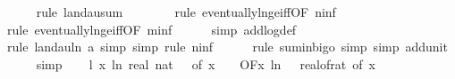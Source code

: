 \begin{isabellebody}
\ \ \ \ \isamarkupfalse%
\ {\isacharparenleft}{\kern0pt}rule\ landau{\isacharunderscore}{\kern0pt}sum{\isacharunderscore}{\kern0pt}{}{\isacharparenright}{\kern0pt}\isanewline
\ \ \ \ \ \ \isamarkupfalse%
\ {\isacharparenleft}{\kern0pt}rule\ eventually{\isacharunderscore}{\kern0pt}ln{\isacharunderscore}{\kern0pt}ge{\isacharunderscore}{\kern0pt}iff{\isacharbrackleft}{\kern0pt}OF\ n{\isacharunderscore}{\kern0pt}inf{\isacharbrackright}{\kern0pt}{\isacharparenright}{\kern0pt}\isanewline
\ \ \ \ \ \isamarkupfalse%
\ {\isacharparenleft}{\kern0pt}rule\ eventually{\isacharunderscore}{\kern0pt}ln{\isacharunderscore}{\kern0pt}ge{\isacharunderscore}{\kern0pt}iff{\isacharbrackleft}{\kern0pt}OF\ m{\isacharunderscore}{\kern0pt}inf{\isacharbrackright}{\kern0pt}{\isacharparenright}{\kern0pt}\isanewline
\ \ \ \ \isamarkupfalse%
\ {\isacharparenleft}{\kern0pt}simp\ add{\isacharcolon}{\kern0pt}log{\isacharunderscore}{\kern0pt}def{\isacharparenright}{\kern0pt}\isanewline
\ \ \ \ \isamarkupfalse%
\ {\isacharparenleft}{\kern0pt}rule\ landau{\isacharunderscore}{\kern0pt}ln{\isacharunderscore}{\kern0pt}{}{\isacharbrackleft}{\kern0pt}\ a{\isacharequal}{\kern0pt}{\isachardoublequoteopen}{}{\isachardoublequoteclose}{\isacharbrackright}{\kern0pt}{\isacharcomma}{\kern0pt}\ simp{\isacharcomma}{\kern0pt}\ simp{\isacharcomma}{\kern0pt}\ rule\ n{\isacharunderscore}{\kern0pt}inf{\isacharparenright}{\kern0pt}\isanewline
\ \ \ \ \isamarkupfalse%
\ {\isacharparenleft}{\kern0pt}rule\ sum{\isacharunderscore}{\kern0pt}in{\isacharunderscore}{\kern0pt}bigo{\isacharcomma}{\kern0pt}\ simp{\isacharcomma}{\kern0pt}\ simp\ add{\isacharcolon}{\kern0pt}unit{\isacharunderscore}{\kern0pt}{}{\isacharparenright}{\kern0pt}\isanewline
\ \ \ \ \isamarkupfalse%
\ simp\isanewline
\isanewline
\ \ \isamarkupfalse%
\ l{}{\isacharcolon}{\kern0pt}\ {\isachardoublequoteopen}{\isacharparenleft}{\kern0pt}{\isasymlambda}x{\isachardot}{\kern0pt}\ ln\ {\isacharparenleft}{\kern0pt}real\ {\isacharparenleft}{\kern0pt}nat\ {\isasymlceil}{}\ {\isacharslash}{\kern0pt}\ {\isacharparenleft}{\kern0pt}{\isasymdelta}{\isacharunderscore}{\kern0pt}of\ x{\isacharparenright}{\kern0pt}\ {\isacharplus}{\kern0pt}\ {}{\isacharparenright}{\kern0pt}{\isacharparenright}{\kern0pt}\ {\isasymin}\ O{\isacharbrackleft}{\kern0pt}{\isacharquery}{\kern0pt}F{\isacharbrackright}{\kern0pt}{\isacharparenleft}{\kern0pt}{\isasymlambda}x{\isachardot}{\kern0pt}\ ln\ {\isacharparenleft}{\kern0pt}{}\ {\isacharslash}{\kern0pt}\ real{\isacharunderscore}{\kern0pt}of{\isacharunderscore}{\kern0pt}rat\ {\isacharparenleft}{\kern0pt}{\isasymepsilon}{\isacharunderscore}{\kern0pt}of\ x{\isacharparenright}{\kern0pt}{\isacharparenright}{\kern0pt}\ {\isacharasterisk}{\kern0pt}\isanewline

\end{isabellebody}
